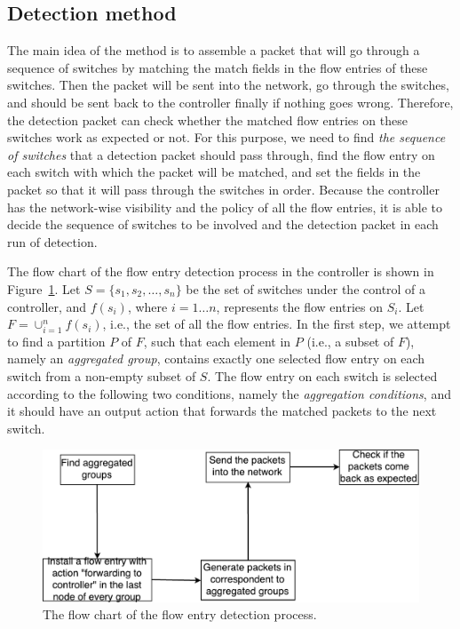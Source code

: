 \subsection{Detection method}
\label{Detection_method}
The main idea of the method is to assemble a packet that will go through a sequence of switches by matching the match fields in the flow entries of these switches. Then the packet will be sent into the network, go through the switches, and should be sent back to the controller finally if nothing goes wrong. Therefore, the detection packet can check whether the matched flow entries on these switches work as expected or not. For this purpose, we need to find \textit{the sequence of switches} that a detection packet should pass through, find the flow entry on each switch with which the packet will be matched, and set the fields in the packet so that it will pass through the switches in order. Because the controller has the network-wise visibility and the policy of all the flow entries, it is able to decide the sequence of switches to be involved and the detection packet in each run of detection.

The flow chart of the flow entry detection process in the controller is shown in Figure~\ref{flow_entry_detection_flowchart}. Let $S=\{s_1,s_2,\ldots,s_n\}$ be the set of switches under the control of a controller, and $f(s_i)$, where $i=1\ldots n$, represents the flow entries on $S_i$. Let $F=\cup_{i=1}^n f(s_i)$, i.e., the set of all the flow entries. In the first step, we attempt to find a partition $P$ of $F$, such that each element in $P$ (i.e., a subset of $F$), namely an \textit{aggregated group}, contains exactly one selected flow entry on each switch from a non-empty subset of $S$. The flow entry on each switch is selected according to the following two conditions, namely the \textit{aggregation conditions}, and it should have an output action that forwards the matched packets to the next switch.

\begin{figure}[H]
\begin{center} 
\includegraphics[width=1\textwidth]{figures/flow_entry_detection_flowchart.pdf}
\end{center}
\caption{The flow chart of the flow entry detection process.}
\label{flow_entry_detection_flowchart}
\end{figure}

